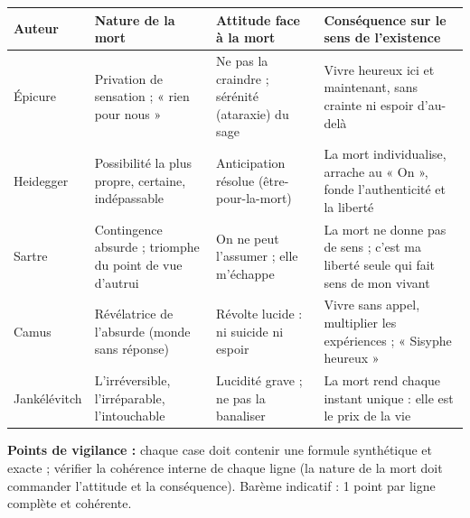 \documentclass[11pt]{article}
\begin{document}
\begin{corrige}
\begin{center}
\begin{tabularx}{\linewidth}{|l|X|X|X|}\hline
\textbf{Auteur} & \textbf{Nature de la mort} & \textbf{Attitude face à la mort} & \textbf{Conséquence sur le sens de l'existence} \\ \hline
Épicure & Privation de sensation ; « rien pour nous » & Ne pas la craindre ; sérénité (ataraxie) du sage & Vivre heureux ici et maintenant, sans crainte ni espoir d'au-delà \\ \hline
Heidegger & Possibilité la plus propre, certaine, indépassable & Anticipation résolue (être-pour-la-mort) & La mort individualise, arrache au « On », fonde l'authenticité et la liberté \\ \hline
Sartre & Contingence absurde ; triomphe du point de vue d'autrui & On ne peut l'assumer ; elle m'échappe & La mort ne donne pas de sens ; c'est ma liberté seule qui fait sens de mon vivant \\ \hline
Camus & Révélatrice de l'absurde (monde sans réponse) & Révolte lucide : ni suicide ni espoir & Vivre sans appel, multiplier les expériences ; « Sisyphe heureux » \\ \hline
Jankélévitch & L'irréversible, l'irréparable, l'intouchable & Lucidité grave ; ne pas la banaliser & La mort rend chaque instant unique : elle est le prix de la vie \\ \hline
\end{tabularx}
\end{center}
\textbf{Points de vigilance :} chaque case doit contenir une formule synthétique et exacte ; vérifier la cohérence interne de chaque ligne (la nature de la mort doit commander l'attitude et la conséquence). Barème indicatif : 1 point par ligne complète et cohérente.
\end{corrige}
\end{document}
